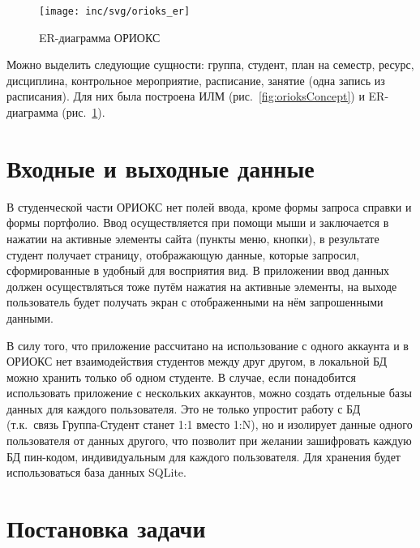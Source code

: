 \begin{figure}[ht]
  \centering
  \texttt{[image: inc/svg/orioks\_er]}
  \caption{ER-диаграмма ОРИОКС}
  \label{fig:orioksEr}
\end{figure}

Можно выделить следующие сущности: группа, студент, план на семестр, ресурс, дисциплина, контрольное мероприятие, расписание, занятие (одна запись из расписания).
Для них была построена ИЛМ (рис.~\ref{fig:orioksConcept}) и ER-диаграмма (рис.~\ref{fig:orioksEr}).


\section{Входные и выходные данные}
\label{sec:io}
В студенческой части ОРИОКС нет полей ввода, кроме формы запроса справки и формы портфолио.
Ввод осуществляется при помощи мыши и заключается в нажатии на активные элементы сайта (пункты меню, кнопки), в результате студент получает страницу, отображающую данные, которые запросил, сформированные в удобный для восприятия вид.
В приложении ввод данных должен осуществляться тоже путём нажатия на активные элементы, на выходе пользователь будет получать экран с отображенными на нём запрошенными данными.

В силу того, что приложение рассчитано на использование с одного аккаунта и в ОРИОКС нет взаимодействия студентов между друг другом, в локальной БД можно хранить только об одном студенте.
В случае, если понадобится использовать приложение с нескольких аккаунтов, можно создать отдельные базы данных для каждого пользователя.
Это не только упростит работу с БД (т.к.\ связь Группа-Студент станет 1:1 вместо 1:N), но и изолирует данные одного пользователя от данных другого, что позволит при желании зашифровать каждую БД пин-кодом, индивидуальным для каждого пользователя.
Для хранения будет использоваться база данных SQLite.


\section{Постановка задачи}
\label{sec:problem}

\conclusions
\label{sec:researchConclusions}
